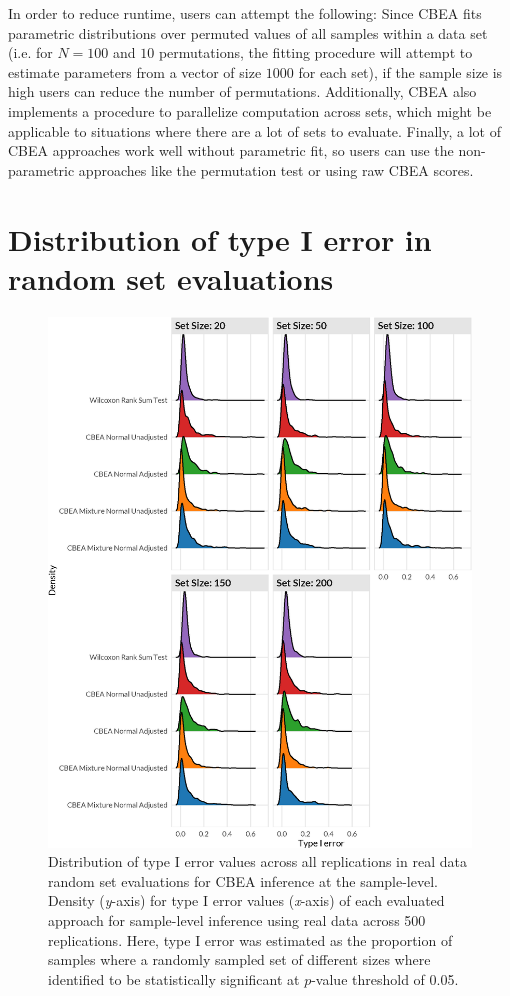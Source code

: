 In order to reduce runtime, users can attempt the following: Since CBEA fits parametric distributions over permuted values of all samples within a data set (i.e. for $N = 100$ and $10$ permutations, the fitting procedure will attempt to estimate parameters from a vector of size $1000$ for each set), if the sample size is high users can reduce the number of permutations. Additionally, CBEA also implements a procedure to parallelize computation across sets, which might be applicable to situations where there are a lot of sets to evaluate. Finally, a lot of CBEA approaches work well without parametric fit, so users can use the non-parametric approaches like the permutation test or using raw CBEA scores. 

\section{Distribution of type I error in random set evaluations}

\begin{figure}[!h]
    \centering
    \includegraphics[width=\linewidth]{figures/appC_fs7.eps}
    \caption[Distribution of type I error values across all replications in real data random set evaluations for CBEA inference at the sample-level]{Distribution of type I error values across all replications in real data random set evaluations for CBEA inference at the sample-level. Density (\emph{y}-axis) for type I error values (\emph{x}-axis) of each evaluated approach for sample-level inference using real data across 500 replications. Here, type I error was estimated as the proportion of samples where a randomly sampled set of different sizes where identified to be statistically significant at $p$-value threshold of 0.05.}
    \label{fig:c7}
\end{figure}